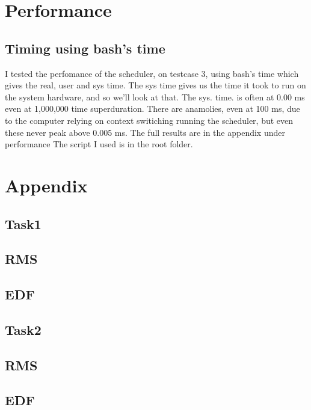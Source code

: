 \documentclass{article}
\begin{document}
    \section{Performance}
    \subsection{Timing using bash's time}
    I tested the perfomance of the scheduler, on testcase 3, using bash's time which gives the real, user and sys time. \newline
    The sys time gives us the time it took to run on the system hardware, and so we'll look at that.
    \newline \newline 
    The sys. time. is often at 0.00 ms even at 1,000,000 time superduration.
    \newline
    There are anamolies, even at 100 ms, due to the computer relying on context switiching running the scheduler, but even these never peak above 0.005 ms. 
    \newline
    The full results are in the appendix under performance
    \newline \newline 
    The script I used is in the root folder. 
    \section{Appendix}
    \subsection{Task1}
    \subsection{RMS}
    
    \subsection{EDF}
    
    
    \subsection{Task2}
    \subsection{RMS}
    
    \subsection{EDF}
    
\end{document}
